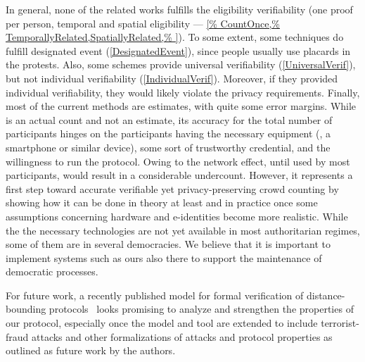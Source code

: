 In general, none of the related works fulfills the eligibility
verifiability (one proof per person, temporal and spatial eligibility ---
\cref{%
  CountOnce,%
  TemporallyRelated,SpatiallyRelated,%
}).
To some extent, some techniques do fulfill designated event (\cref{DesignatedEvent}), since people usually use placards in the protests.
Also, some schemes provide universal verifiability (\cref{UniversalVerif}), but not individual verifiability (\cref{IndividualVerif}).
Moreover, if they provided individual verifiability, they would likely violate the privacy requirements.
Finally, most of the current methods are estimates, with quite some error margins. 
While \PRIVO is an actual count and not an estimate, its accuracy for the total number of participants hinges on the participants having the necessary equipment (\ie, a smartphone or similar device), some sort of trustworthy credential, and the willingness to run the protocol. 
Owing to the network effect, until used by most participants, \PRIVO would result in a considerable undercount. 
However, it represents a first step toward accurate verifiable yet privacy-preserving crowd counting by showing how it can be done in theory at least and in practice once some assumptions concerning hardware and e-identities become more realistic. 
While the the necessary technologies are not yet available in most authoritarian regimes, some of them are in several democracies. We believe that it is important to implement systems such as ours also there to support the maintenance of democratic processes.

For future work, a recently published model for formal verification of distance-bounding protocols~\cite{TamarinDB} looks promising to analyze and strengthen the properties of our protocol, especially once the model and tool are extended to include terrorist-fraud attacks and other formalizations of attacks and protocol properties as outlined as future work by the authors.

